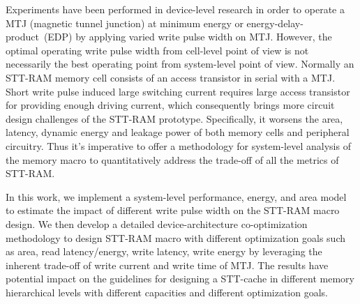 Experiments have been performed in device-level research in order to operate a MTJ (magnetic tunnel junction) at minimum energy or energy-delay-product~(EDP) by applying varied write pulse width on MTJ. However, the optimal operating write pulse width from cell-level point of view is not necessarily the best operating point from system-level point of view. Normally an STT-RAM memory cell consists of an access transistor in serial with a MTJ. Short write pulse induced large switching current requires large access transistor for providing enough driving current, which consequently brings more circuit design challenges of the STT-RAM prototype. Specifically, it worsens the area, latency, dynamic energy and leakage power of both memory cells and peripheral circuitry.  Thus it's imperative to offer a methodology for system-level analysis of the memory macro to quantitatively address the trade-off of all the metrics of STT-RAM.

In this work, we implement a system-level performance, energy, and area model to estimate the impact of different write pulse width on the STT-RAM macro design. We then develop a detailed device-architecture co-optimization methodology to design STT-RAM macro with different optimization goals such as area, read latency/energy, write latency, write energy by leveraging the inherent trade-off of write current and write time of MTJ. The results have potential impact on the guidelines for designing a STT-cache in different memory hierarchical levels with different capacities and different optimization goals.

\begin{comment}
Comment Paragraph
\end{comment} 